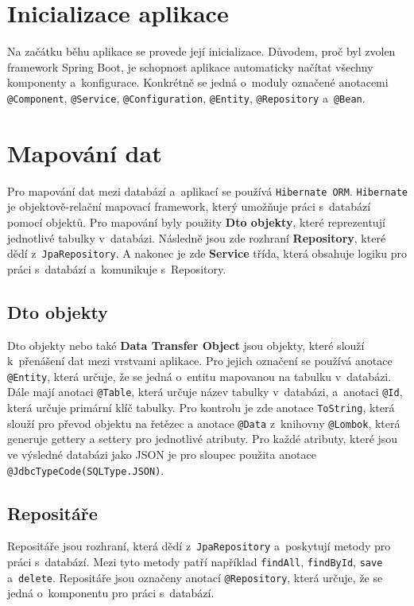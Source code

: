 \section{Inicializace aplikace}
Na začátku běhu aplikace se provede její inicializace.
Důvodem, proč byl zvolen framework Spring Boot, je schopnost aplikace automaticky
načítat všechny komponenty a~konfigurace.
Konkrétně se jedná o~moduly označené anotacemi \texttt{@Component}, \texttt{@Service},
\texttt{@Configuration}, \texttt{@Entity}, \texttt{@Repository} a~\texttt{@Bean}.

\section{Mapování dat}
\label{sec:mapovaniDat}
Pro mapování dat mezi databází a~aplikací se používá \texttt{Hibernate ORM}.
\texttt{Hibernate} je objektově-relační mapovací framework, který umožňuje práci s~databází pomocí objektů.
Pro mapování byly použity \textbf{Dto objekty}, které reprezentují jednotlivé tabulky v~databázi.
Následně jsou zde rozhraní \textbf{Repository}, které dědí z~\texttt{JpaRepository}.
A nakonec je zde \textbf{Service} třída, která obsahuje logiku pro práci s~databází a~komunikuje s~Repository.

\subsection{Dto objekty}
Dto objekty nebo také \textbf{Data Transfer Object} jsou objekty, které slouží k~přenášení dat mezi vrstvami aplikace.
Pro jejich označení se používá anotace \texttt{@Entity}, která určuje, že se jedná o~entitu mapovanou na tabulku v~databázi.
Dále mají anotaci \texttt{@Table}, která určuje název tabulky v~databázi, a~anotaci \texttt{@Id}, která určuje primární klíč tabulky.
Pro kontrolu je zde anotace \texttt{ToString}, která slouží pro převod objektu na řetězec a anotace \texttt{@Data} 
z~knihovny \texttt{@Lombok}, která generuje gettery a settery pro jednotlivé atributy.
Pro každé atributy, které jsou ve výsledné databázi jako JSON je pro sloupec použita anotace \texttt{@JdbcTypeCode(SQLType.JSON)}.

\subsection{Repositáře}
Repositáře jsou rozhraní, která dědí z~\texttt{JpaRepository} a~poskytují metody pro práci s~databází.
Mezi tyto metody patří například \texttt{findAll}, \texttt{findById}, \texttt{save} a~\texttt{delete}.
Repositáře jsou označeny anotací \texttt{@Repository}, která určuje, že se jedná o~komponentu pro práci s~databází.

